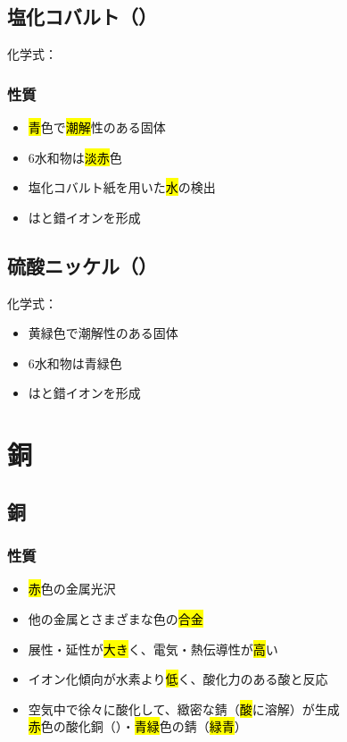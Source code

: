 \subsection{塩化コバルト（）}
化学式：\hl{}
\subsubsection{性質}
\begin{itemize}
  \item \hl{青}色で\hl{潮解}性のある固体
  \item 6水和物は\hl{淡赤}色
  \item 塩化コバルト紙を用いた\hl{水}の検出
  \item {}は\hl{}と錯イオンを形成
\end{itemize}
\subsection{硫酸ニッケル（）}
化学式：\hl{}
\begin{itemize}
  \item 黄緑色で潮解性のある固体
  \item 6水和物は青緑色
  \item {}は\hl{}と錯イオンを形成
\end{itemize}
\section{銅}
\subsection{銅}
\subsubsection{性質}
\begin{itemize}
  \item \hl{赤}色の金属光沢
  \item 他の金属とさまざまな色の\hl{合金}
  \item 展性・延性が\hl{大き}く、電気・熱伝導性が\hl{高}い
  \item イオン化傾向が水素より\hl{低}く、酸化力のある酸と反応\\
  \item 空気中で徐々に酸化して、緻密な錆（\hl{酸}に溶解）が生成\\
        \hl{赤}色の酸化銅（）・\hl{青緑}色の錆（\hl{緑青}）
\end{itemize}

